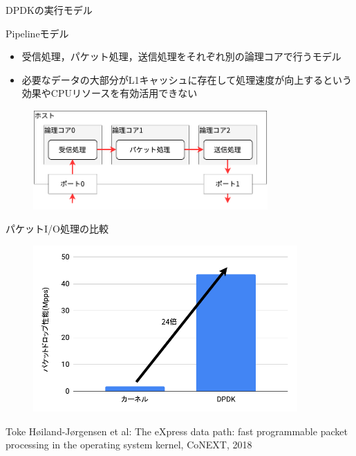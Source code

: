 \documentclass[12pt, unicode]{beamer}
\begin{document}
\begin{frame}{DPDKの実行モデル}
  \begin{block}{Pipelineモデル}
    \begin{itemize}
      \item 受信処理，パケット処理，送信処理をそれぞれ別の論理コアで行うモデル
      \item 必要なデータの大部分がL1キャッシュに存在して処理速度が向上するという効果やCPUリソースを有効活用できない
    \end{itemize}
  \end{block}

  \begin{figure}[h]
    \centering
    \includegraphics[width=0.8\textwidth]{pictures/Pipeline.pdf}
  \end{figure}
\end{frame}

\begin{frame}{パケットI/O処理の比較}
  \begin{figure}[h]
    \centering
    \includegraphics[width=0.9\textwidth]{pictures/PacketIOComparison.pdf}
  \end{figure}

  \scriptsize{Toke Høiland-Jørgensen et al: The eXpress data path: fast programmable packet processing in the operating system kernel, CoNEXT, 2018}
\end{frame}
\end{document}
